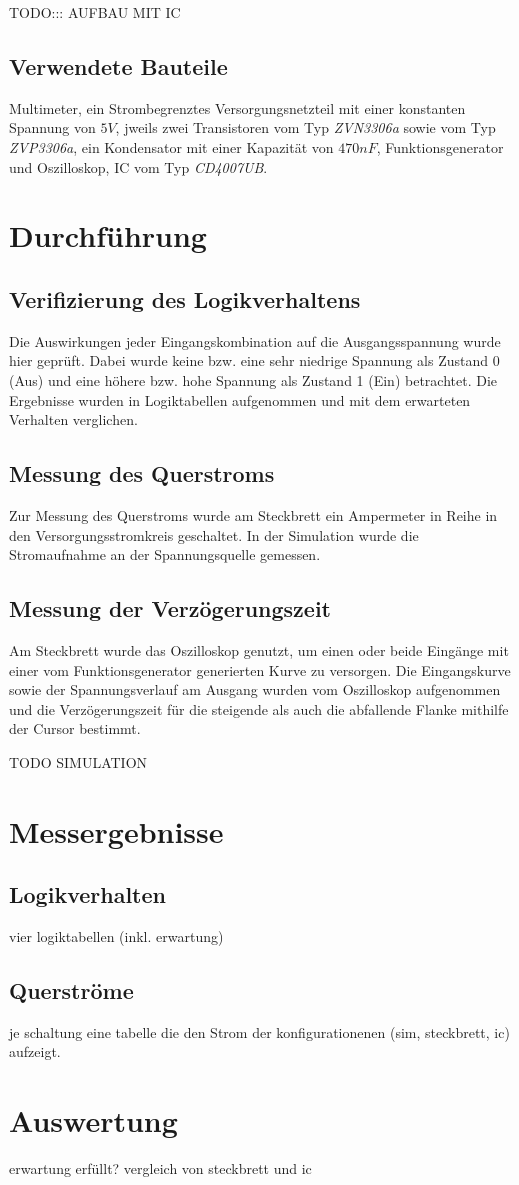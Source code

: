 \documentclass[11pt, a4paper]{article}
\begin{document}
TODO::: AUFBAU MIT IC

\subsection*{Verwendete Bauteile}
Multimeter, ein Strombegrenztes Versorgungsnetzteil mit einer konstanten Spannung von $5V$, jweils zwei Transistoren vom Typ \textit{ZVN3306a} sowie vom Typ \textit{ZVP3306a}, ein Kondensator mit einer Kapazität von $470nF$, Funktionsgenerator und Oszilloskop, IC vom Typ \textit{CD4007UB}.
\section*{Durchführung}
\subsection*{Verifizierung des Logikverhaltens}
Die Auswirkungen jeder Eingangskombination auf die Ausgangsspannung wurde hier geprüft. Dabei wurde keine bzw. eine sehr niedrige Spannung als Zustand 0 (Aus) und eine höhere bzw. hohe Spannung als Zustand 1 (Ein) betrachtet. Die Ergebnisse wurden in Logiktabellen aufgenommen und mit dem erwarteten Verhalten verglichen.
\subsection*{Messung des Querstroms}
Zur Messung des Querstroms wurde am Steckbrett ein Ampermeter in Reihe in den Versorgungsstromkreis geschaltet. In der Simulation wurde die Stromaufnahme an der Spannungsquelle gemessen.
\subsection*{Messung der Verzögerungszeit}
Am Steckbrett wurde das Oszilloskop genutzt, um einen oder beide Eingänge mit einer vom Funktionsgenerator generierten Kurve zu versorgen. Die Eingangskurve sowie der Spannungsverlauf am Ausgang wurden vom Oszilloskop aufgenommen und die Verzögerungszeit für die steigende als auch die abfallende Flanke mithilfe der Cursor bestimmt.

TODO SIMULATION
\section*{Messergebnisse}
\subsection*{Logikverhalten}
vier logiktabellen (inkl. erwartung)
\subsection*{Querströme}
je schaltung eine tabelle die den Strom der konfigurationenen (sim, steckbrett, ic) aufzeigt.
\section*{Auswertung}
erwartung erfüllt? vergleich von steckbrett und ic
\end{document}
